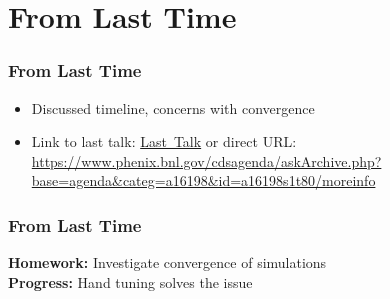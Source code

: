 \section{From Last Time}
\label{sec:from_last_time}

\begin{frame}
  \frametitle{From Last Time}
  \begin{itemize}
    \item Discussed timeline, concerns with convergence
    \item Link to last talk:
      \href{https://www.phenix.bnl.gov/cdsagenda/askArchive.php?base=agenda&categ=a16198&id=a16198s1t80/moreinfo}{Last~Talk}
      or direct URL:
      \url{https://www.phenix.bnl.gov/cdsagenda/askArchive.php?base=agenda&categ=a16198&id=a16198s1t80/moreinfo}
  \end{itemize}
\end{frame}

\begin{frame}
  \frametitle{From Last Time}
  \textbf{Homework:} Investigate convergence of simulations\\
  \textbf{Progress:} Hand tuning solves the issue\\
\end{frame}
